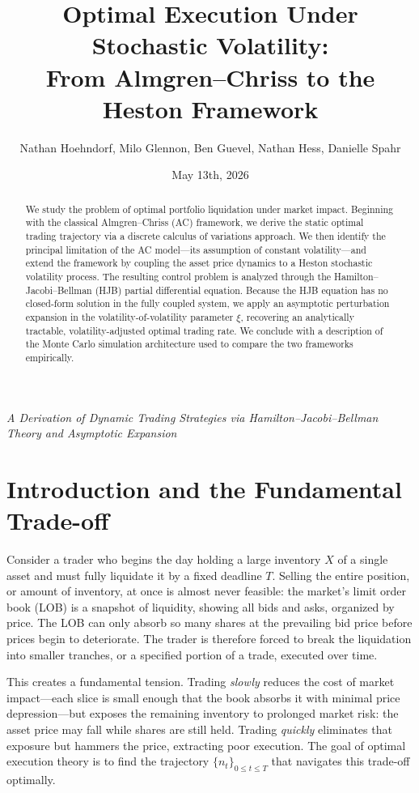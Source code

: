 \documentclass[11pt]{article}
\title{Optimal Execution Under Stochastic Volatility:\\
From Almgren--Chriss to the Heston Framework}
\author{Nathan Hoehndorf, Milo Glennon, Ben Guevel, Nathan Hess, Danielle Spahr}
\date{May 13th, 2026}
\begin{document}
\maketitle

\begin{center}
\textit{A Derivation of Dynamic Trading Strategies via Hamilton--Jacobi--Bellman Theory and Asymptotic Expansion}
\end{center}

\vspace{1em}

\begin{abstract}
We study the problem of optimal portfolio liquidation under market impact. Beginning with the classical Almgren--Chriss (AC) framework, we derive the static optimal trading trajectory via a discrete calculus of variations approach. We then identify the principal limitation of the AC model---its assumption of constant volatility---and extend the framework by coupling the asset price dynamics to a Heston stochastic volatility process. The resulting control problem is analyzed through the Hamilton--Jacobi--Bellman (HJB) partial differential equation. Because the HJB equation has no closed-form solution in the fully coupled system, we apply an asymptotic perturbation expansion in the volatility-of-volatility parameter $\xi$, recovering an analytically tractable, volatility-adjusted optimal trading rate. We conclude with a description of the Monte Carlo simulation architecture used to compare the two frameworks empirically.
\end{abstract}

\section{Introduction and the Fundamental Trade-off}

Consider a trader who begins the day holding a large inventory $X$ of a single asset and must fully liquidate it by a fixed deadline $T$. Selling the entire position, or amount of inventory, at once is almost never feasible: the market's limit order book (LOB) is a snapshot of liquidity, showing all bids and asks, organized by price. The LOB can only absorb so many shares at the prevailing bid price before prices begin to deteriorate. The trader is therefore forced to break the liquidation into smaller tranches, or a specified portion of a trade, executed over time.

This creates a fundamental tension. Trading \emph{slowly} reduces the cost of market impact---each slice is small enough that the book absorbs it with minimal price depression---but exposes the remaining inventory to prolonged market risk: the asset price may fall while shares are still held. Trading \emph{quickly} eliminates that exposure but hammers the price, extracting poor execution. The goal of optimal execution theory is to find the trajectory $\{n_t\}_{0 \le t \le T}$ that navigates this trade-off optimally.
\end{document}
